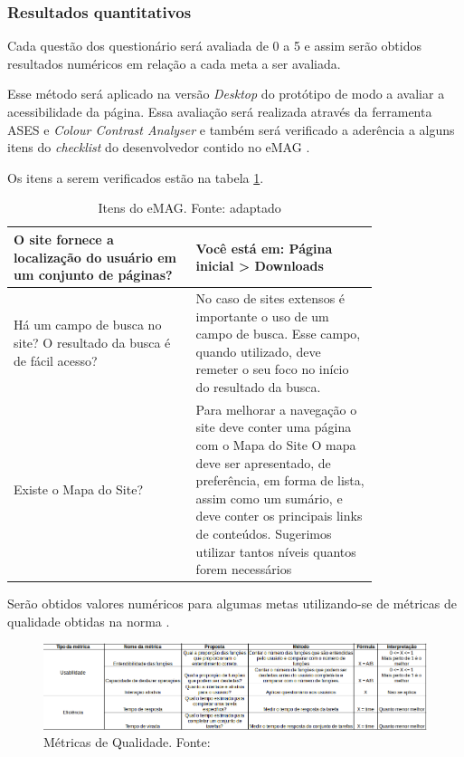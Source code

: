 \subsubsection{Resultados quantitativos}

  Cada questão dos questionário será avaliada de 0 a 5 e assim serão obtidos resultados numéricos
  em relação a cada meta a ser avaliada.

  
  Esse método será aplicado na versão \textit{Desktop} do protótipo de modo a avaliar a acessibilidade da página.
  Essa avaliação será realizada através da ferramenta ASES e \textit{Colour Contrast Analyser} e também será
  verificado a aderência a alguns itens do \textit{checklist} do desenvolvedor contido no eMAG \cite{emag}.
  
  Os itens a serem verificados estão na tabela \ref{tab:emag}.
  
  \begin{table}[!h]
\caption{Itens do eMAG. Fonte: \cite{emag} adaptado}
\centering
\label{tab:emag}
  \begin{tabular}{p{0.40\linewidth}p{0.40\linewidth}}
  \hline
  O site fornece a localização do usuário em um conjunto de páginas? & Você está em: Página inicial > Downloads\\
  \hline
  Há um campo de busca no site? O resultado da busca é de fácil acesso? & No caso de sites extensos é importante o uso de um campo de busca. Esse campo, quando utilizado, deve remeter o seu foco no início do resultado da busca.\\
\hline
Existe o Mapa do Site? & Para melhorar a navegação o site deve conter uma página com o Mapa do Site O mapa deve ser apresentado, de preferência, em forma de lista, assim como um sumário, e deve conter os principais links de conteúdos. Sugerimos utilizar tantos níveis quantos forem necessários\\
 \hline
  \end{tabular}
\end{table}

  
  Serão obtidos valores numéricos para algumas metas utilizando-se de métricas de qualidade obtidas na
  norma .
\vfill
  \pagebreak
  \begin{figure}[!h]
  \centering
    \includegraphics[keepaspectratio=true, scale=0.6, angle=-90]{figuras/qualidade.png}
  \caption{Métricas de Qualidade. Fonte: \cite{iso}}
  \label{fig:metricas}
\end{figure}

